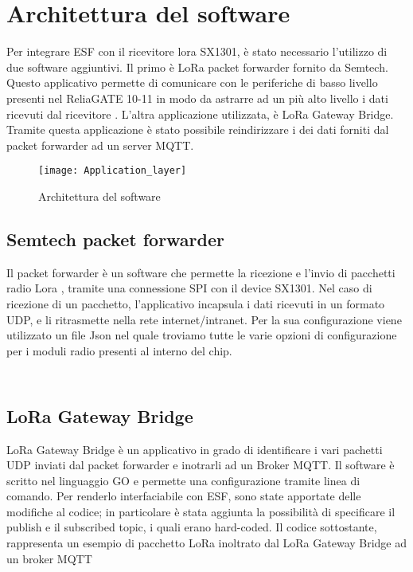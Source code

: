 \section{Architettura del software}
Per integrare ESF con il ricevitore lora SX1301, è stato necessario l'utilizzo
di due software aggiuntivi.
Il primo è LoRa packet forwarder fornito da Semtech. Questo
applicativo permette di comunicare con le periferiche di basso livello presenti
nel ReliaGATE 10-11 in modo da astrarre ad un più alto livello i dati ricevuti dal
ricevitore .
L'altra applicazione utilizzata, è LoRa Gateway Bridge. Tramite questa
applicazione è stato possibile 
reindirizzare i dei dati forniti dal packet forwarder ad un server MQTT.

\begin{figure}[th]
        \centering 
                \texttt{[image: Application\_layer]}
        \caption{Architettura del software}
        \label{fig:Software_stack}
\end{figure}

\subsection{Semtech packet forwarder}
Il packet forwarder è un software che permette la ricezione e l'invio di pacchetti radio Lora ,
tramite una connessione SPI con il device SX1301. Nel caso di ricezione di un
pacchetto, l'applicativo incapsula i dati ricevuti in un formato UDP, e li
ritrasmette nella rete internet/intranet. Per la sua configurazione viene
utilizzato un file Json nel quale troviamo tutte le varie opzioni di
configurazione per i moduli radio presenti al interno del chip.
\inputminted[mathescape, gobble=2, frame=lines, linenos=true
framesep=2mm, firstline=1,lastline=23]{json}{Code_Files/global_json.conf}
\inputminted[mathescape, gobble=2, frame=lines, linenos=true
framesep=2mm, firstline=173,lastline=184]{json}{Code_Files/global_json.conf}

\subsection{LoRa Gateway Bridge}
LoRa Gateway Bridge è un applicativo in grado di identificare i vari pachetti UDP inviati
dal packet forwarder e inotrarli ad un Broker MQTT. 
Il software è scritto nel linguaggio GO e permette una configurazione tramite
linea di comando.  Per renderlo interfaciabile con ESF, sono state apportate delle 
modifiche al codice; in particolare è stata aggiunta la possibilità di
specificare il publish e il subscribed topic, i quali erano hard-coded.
Il codice sottostante, rappresenta un esempio di pacchetto LoRa inoltrato dal
LoRa Gateway Bridge ad un broker MQTT
\inputminted[mathescape, gobble=2, frame=lines, linenos=true
framesep=2mm, firstline=1,lastline=23]{json}{Code_Files/message.json}
